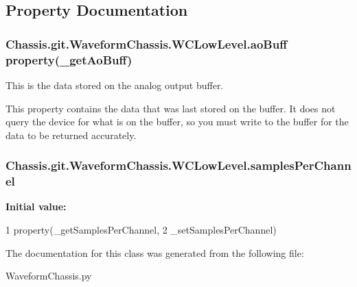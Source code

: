 \subsection{Property Documentation}
\hypertarget{class_chassis_8git_1_1_waveform_chassis_1_1_w_c_low_level_afd1e6c5023de1afc7b6dcad30782e938}{
\subsubsection[{ao\-Buff}]{\setlength{\rightskip}{0pt plus 5cm}Chassis.\-git.\-Waveform\-Chassis.\-W\-C\-Low\-Level.\-ao\-Buff property(\-\_\-get\-Ao\-Buff)\hspace{0.3cm}{\ttfamily [static]}}}\label{class_chassis_8git_1_1_waveform_chassis_1_1_w_c_low_level_afd1e6c5023de1afc7b6dcad30782e938}


This is the data stored on the analog output buffer. 

This property contains the data that was last stored on the buffer. It does not query the device for what is on the buffer, so you must write to the buffer for the data to be returned accurately. \hypertarget{class_chassis_8git_1_1_waveform_chassis_1_1_w_c_low_level_a48df627ebe6ffef971efbcff9ff9aa6f}{
\subsubsection[{samples\-Per\-Channel}]{\setlength{\rightskip}{0pt plus 5cm}Chassis.\-git.\-Waveform\-Chassis.\-W\-C\-Low\-Level.\-samples\-Per\-Channel\hspace{0.3cm}{\ttfamily [static]}}}\label{class_chassis_8git_1_1_waveform_chassis_1_1_w_c_low_level_a48df627ebe6ffef971efbcff9ff9aa6f}
{\bfseries Initial value\-:}
\begin{DoxyCode}
1 property(\_getSamplesPerChannel,
2             \_setSamplesPerChannel)
\end{DoxyCode}


The documentation for this class was generated from the following file\-:\begin{DoxyCompactItemize}
\item 
Waveform\-Chassis.\-py\end{DoxyCompactItemize}
